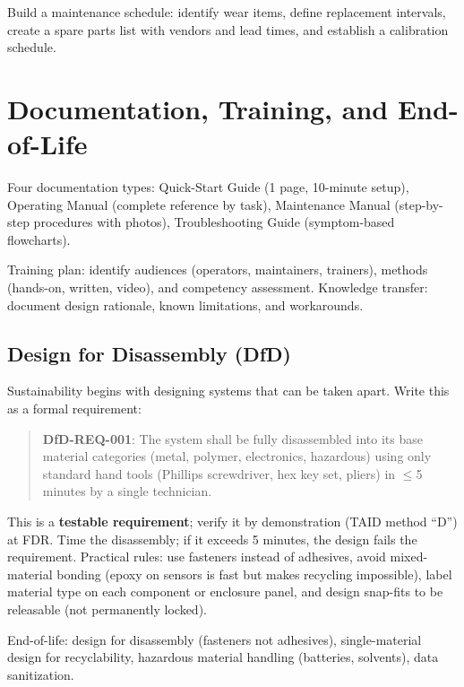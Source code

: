 \documentclass[11pt,letterpaper,twoside,openany]{book}
\begin{document}
Build a maintenance schedule: identify wear items, define replacement intervals, create a spare parts list with vendors and lead times, and establish a calibration schedule.

\section{Documentation, Training, and End-of-Life}
Four documentation types: Quick-Start Guide (1 page, 10-minute setup), Operating Manual (complete reference by task), Maintenance Manual (step-by-step procedures with photos), Troubleshooting Guide (symptom-based flowcharts).

Training plan: identify audiences (operators, maintainers, trainers), methods (hands-on, written, video), and competency assessment. Knowledge transfer: document design rationale, known limitations, and workarounds.


\subsection{Design for Disassembly (DfD)}
Sustainability begins with designing systems that can be taken apart. Write this as a formal requirement:

\begin{quote}
\textbf{DfD-REQ-001}: The system shall be fully disassembled into its base material categories (metal, polymer, electronics, hazardous) using only standard hand tools (Phillips screwdriver, hex key set, pliers) in $\leq$5 minutes by a single technician.
\end{quote}

This is a \textbf{testable requirement}; verify it by demonstration (TAID method ``D'') at FDR. Time the disassembly; if it exceeds 5 minutes, the design fails the requirement. Practical rules: use fasteners instead of adhesives, avoid mixed-material bonding (epoxy on sensors is fast but makes recycling impossible), label material type on each component or enclosure panel, and design snap-fits to be releasable (not permanently locked).

End-of-life: design for disassembly (fasteners not adhesives), single-material design for recyclability, hazardous material handling (batteries, solvents), data sanitization.
\end{document}
